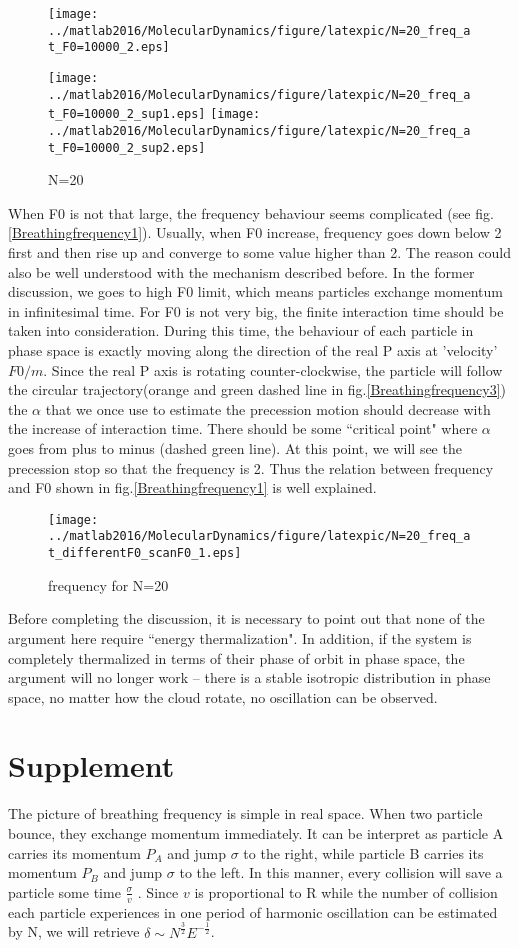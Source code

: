\documentclass[a4paper,onecolumn,12pt]{article}
\begin{document}
\begin{figure}[hbtp]

\centering
\texttt{[image: ../matlab2016/MolecularDynamics/figure/latexpic/N=20\_freq\_at\_F0=10000\_2.eps]}
\caption{N=20}
\texttt{[image: ../matlab2016/MolecularDynamics/figure/latexpic/N=20\_freq\_at\_F0=10000\_2\_sup1.eps]}
\texttt{[image: ../matlab2016/MolecularDynamics/figure/latexpic/N=20\_freq\_at\_F0=10000\_2\_sup2.eps]}
\end{figure}

When F0 is not that large, the frequency behaviour seems complicated (see fig.\ref{Breathingfrequency1}). Usually, when F0 increase, frequency goes down below 2 first and then rise up and converge to some value higher than 2. The reason could also be well understood with the mechanism described before. In the former discussion, we goes to high F0 limit, which means particles exchange momentum in infinitesimal time. For F0 is not very big, the finite interaction time should be taken into consideration. During this time, the behaviour of each particle in phase space is exactly moving along the direction of the real P axis at 'velocity' $F0/m$. Since the real P axis is rotating counter-clockwise, the particle will follow the circular trajectory(orange and green dashed line in fig.\ref{Breathingfrequency3}) the $\alpha$ that we once use to estimate the precession motion should decrease with the increase of interaction time. There should be some ``critical point" where $\alpha$ goes from plus to minus (dashed green line). At this point, we will see the precession stop so that the frequency is 2. Thus the relation between frequency and F0 shown in fig.\ref{Breathingfrequency1} is well explained.
 
\begin{figure}[hbtp]
\centering
\texttt{[image: ../matlab2016/MolecularDynamics/figure/latexpic/N=20\_freq\_at\_differentF0\_scanF0\_1.eps]}
\caption{frequency for N=20}
\end{figure}

 

Before completing the discussion, it is necessary to point out that none of the argument here require ``energy thermalization". In addition, if the system is completely thermalized in terms of their phase of orbit in phase space, the argument will no longer work -- there is a stable isotropic distribution in phase space, no matter how the cloud rotate, no oscillation can be observed.
 
 
\section{Supplement}
The picture of breathing frequency is simple in real space. When two particle bounce, they exchange momentum immediately. It can be interpret as particle A carries its momentum $P_A$ and jump $\sigma$ to the right, while particle B carries its momentum $P_B$ and jump $\sigma$ to the left. In this manner, every collision will save a particle some time $\frac{\sigma}{v}$ . Since $v$ is proportional to R while the number of collision each particle experiences in one period of harmonic oscillation can be estimated by N, we will retrieve $\delta\sim N^{\frac{3}{2}}E^{-\frac{1}{2}}$. 
 
 
\end{document}
